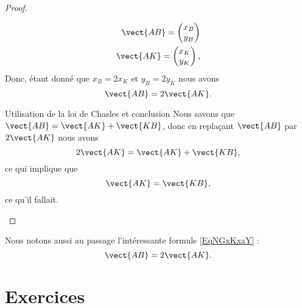 \begin{proof}
\begin{subproof}
            \begin{subequations}
                \begin{align}
                    \vect{ AB }=\begin{pmatrix}
                        x_B    \\ 
                        y_B    
                    \end{pmatrix}\\
                    \vect{ AK }=\begin{pmatrix}
                        x_K    \\ 
                        y_K    
                    \end{pmatrix},
                \end{align}
            \end{subequations}
            Donc, étant donné que \( x_B=2x_K\) et \( y_B=2y_K\) nous avons
            \begin{equation}    \label{EqNGxKxaY}
                \vect{ AB }=2\vect{ AK }.
            \end{equation}
        \item[Utilisation de la loi de Chasles et conclusion]
            Nous savons que \( \vect{ AB }=\vect{ AK }+\vect{ KB }\), donc en replaçant \( \vect{ AB }\) par \( 2\vect{ AK }\) nous avons
            \begin{equation}
                2\vect{ AK }=\vect{ AK }+\vect{ KB },
            \end{equation}
            ce qui implique que
            \begin{equation}
                \vect{ AK }=\vect{ KB },
            \end{equation}
            ce qu'il fallait.
    \end{subproof}
\end{proof}
Nous notons aussi au passage l'intéressante formule \eqref{EqNGxKxaY} :
\begin{equation}
    \vect{ AB }=2\vect{ AK }.
\end{equation}

\section{Exercices}

